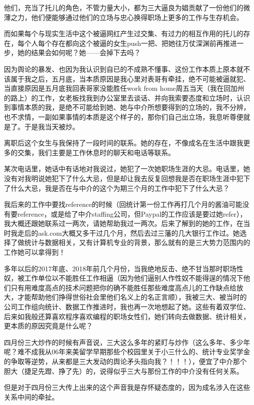 \documentclass[9pt, b5paper]{article}
\begin{document}
他们，充当了托儿的角色，不管力量大小，都为三大逼良为娼贡献了一份他们的微薄之力，他们便能够通过他们的立场与忠心换得职场上更多的工作与生存机会。

而如果每个与现实生活中这个被逼网红产生过交集、有过力的相互作用的托儿的存在，每个人每个存在都向这个被逼的女生push一把、把她往万仗深渊前再推进一步，她的结果会如何呢？她——会掉下去吗？

因为舆论的暴发、也因为我认识到自已的不成熟不懂事、这份工作本质上原本就不该属于我之后，五月底，当本质原因是我心里对表哥有牵挂，绝不可能被逼就犯、当直接原因是五月底我回表哥家没能胜任work from home周五当天（我在回加州的路上）的工作，女老板找我到办公室里去谈话、并向我索要态度和立场时，认识到事情本质的我，是绝不可能给到她、她与中介所想要得到的立场的，我不分辨，也不求情，一副如果事情的本质是这个样子的，那你们自己出立场，我息听尊便就是了。于是我当天被炒。 

离职后这个女生与我保持了一段时间的联系。她的存在，不像成名在生活中跟我更多的交集，我们主要是工作休息时的聊天和电话等联系。

某次电话里，她话中有话地对我说过，她犯了一次她职场生涯的大忌。电话里，她没有对我明说她犯下了什么大忌，但是却让我去反复回想我是否在职场生涯中犯下了什么大忌，我是否在与中介的这个为期三个月的工作中犯下了什么大忌？

我后来的工作中要找reference的时候（回统计第一份工作再打几个月的酱油可能没有要reference，或是给了中介staffing公司，但Paypal的工作应该是要过她refer），我大概还跟她联系过一两次，请她帮助我过一两次。后来了解到的她的工作，在当时我走后的ask.com大概又多干过几个月，然后去过三藩的几大银行工作过。她选择了做统计与数据相关，又有计算机专业的背景，那么就有的是三大势力范围内的工作她可以拿得到！

多年以后的2017年底、2018年前几个月份，当我绝地反击、绝不甘当那时职场性奴，被工作单位以不能胜任工作相逼（因为他们逼别人作性奴不能得逞的情况下他们只有用难度高点的技术问题把你的确不能胜任那些难度高点儿的工作缺点给放大，才能帮助他们挣得世俗社会里他们名义上的名正言顺），我被三大、被当时的公司工作组向统计、数据工作推进时，我也再一次地想起了她。这些有着双学位、后来如我般还算喜欢程序喜欢编程的职场女性们，她们转向去做数据、统计相关，更本质的原因究竟是什么呢？ 

四月份三大炒作的时候有声音说，三大这么多年的紧盯与炒作（这么多年、多少年呢？难不成我从06年来美留学早期那些个校园里关于小三什么的、统计专业奖学金的争取等逆势，从来都是三大发动的舆论矛头指向我？！！！），便宜了中介那个胆大（捷足先蹬、挣了先）的，说得似乎三大与那份工作的中介没有任何关系。

但是对于四月份三大传上出来的这个声音我是存怀疑态度的，因为成名涉入在这些关系中间的牵扯。 
\end{document}
